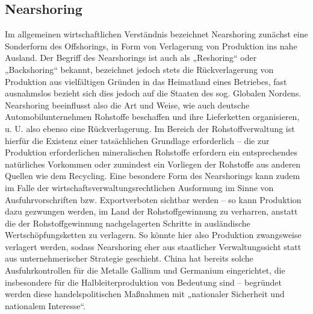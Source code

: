\documentclass[12pt,a4paper,oneside]{book} %
\begin{document}
	\subsection{Nearshoring}
	Im allgemeinen wirtschaftlichen Verständnis bezeichnet Nearshoring zunächst eine Sonderform des Offshorings, in Form von Verlagerung von Produktion ins nahe Ausland.\autocite{bendel_nearshoring_2022} Der Begriff des Nearshorings ist auch als „Reshoring“ oder „Backshoring“ bekannt, bezeichnet jedoch stets die Rückverlagerung von Produktion aus vielfältigen Gründen in das Heimatland eines Betriebes, fast ausnahmslos bezieht sich dies jedoch auf die Staaten des sog. Globalen Nordens.\autocite{butollo_deglobalisierung_2022} Nearshoring beeinflusst also die Art und Weise, wie auch deutsche Automobilunternehmen Rohstoffe beschaffen und ihre Lieferketten organisieren, u. U. also ebenso eine Rückverlagerung. Im Bereich der Rohstoffverwaltung ist hierfür die Existenz einer tatsächlichen Grundlage erforderlich – die zur Produktion erforderlichen mineralischen Rohstoffe erfordern ein entsprechendes natürliches Vorkommen oder zumindest ein Vorliegen der Rohstoffe aus anderen Quellen wie dem Recycling. Eine besondere Form des Nearshorings kann zudem im Falle der wirtschaftsverwaltungsrechtlichen Ausformung im Sinne von Ausfuhrvorschriften bzw. Exportverboten sichtbar werden – so kann Produktion dazu gezwungen werden, im Land der Rohstoffgewinnung zu verharren, anstatt die der Rohstoffgewinnung nachgelagerten Schritte in ausländische Wertschöpfungsketten zu verlagern. So könnte hier also Produktion zwangsweise verlagert werden, sodass Nearshoring eher aus staatlicher Verwaltungssicht statt aus unternehmerischer Strategie geschieht. China hat bereits solche Ausfuhrkontrollen für die Metalle Gallium und Germanium eingerichtet, die insbesondere für die Halbleiterproduktion von Bedeutung sind – begründet werden diese handelspolitischen Maßnahmen mit „nationaler Sicherheit und nationalem Interesse“. \autocite{lamby-schmitt_china_2023}
\end{document}
